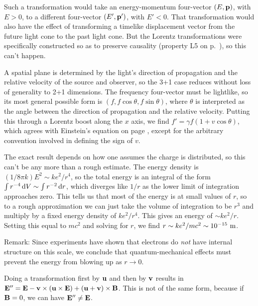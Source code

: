 
Such a transformation would take an energy-momentum four-vector $(E,\mathbf{p})$, with $E>0$, to
a different four-vector $(E',\mathbf{p}')$, with $E'<0$. That transformation would also have the
effect of transforming a timelike displacement vector from the future light cone to the past
light cone. But the Lorentz transformations were specifically constructed so as to preserve
causality (property L5 on p.~\pageref{sec:lorentz-geometry}), so this can't happen.


A spatial plane is determined by the light's direction of propagation and the relative velocity
of the source and observer, so the 3+1 case reduces without loss of generality to 2+1 dimensions.
The frequency four-vector must be lightlike, so its most general possible form is
$(f,f\cos\theta,f\sin\theta)$, where $\theta$ is interpreted as the angle between the direction of
propagation and the relative velocity. Putting this through a Lorentz boost along the $x$ axis,
we find $f'=\gamma f(1+v\cos\theta)$, which agrees with Einstein's equation on page
\pageref{einstein-doppler}, except for the arbitrary convention involved in defining the sign of $v$.


The exact result depends on how one assumes the charge is distributed, so this can't be any more than a rough
estimate. The energy density is $(1/8\pi k)E^2 \sim ke^2/r^4$, so the total energy is an integral of the form
$\int r^{-4} \operatorname{d\!} V \sim \int r^{-2} \operatorname{d\!} r$, which diverges like $1/r$ as the lower limit of integration approaches
zero. This tells us that most of the energy is at small values of $r$, so to a rough approximation we can just
take the volume of integration to be $r^3$ and multiply by a fixed energy density of $ke^2/r^4$. This gives
an energy of $\sim ke^2/r$. Setting this equal to $mc^2$ and solving for $r$, we find $r \sim ke^2/mc^2 \sim 10^{-15}\ \munit$.

Remark: Since experiments have shown that electrons do \emph{not} have internal structure on this scale, we conclude that
quantum-mechanical effects must prevent the energy from blowing up as $r\rightarrow 0$.


Doing a transformation first by $\mathbf{u}$ and then by $\mathbf{v}$ results in
$\mathbf{E}''=\mathbf{E}-\mathbf{v}\times(\mathbf{u}\times\mathbf{E})+(\mathbf{u}+\mathbf{v})\times\mathbf{B}$. This is not of the same
form, because if $\mathbf{B}=0$, we can have $\mathbf{E}''\ne\mathbf{E}$.

